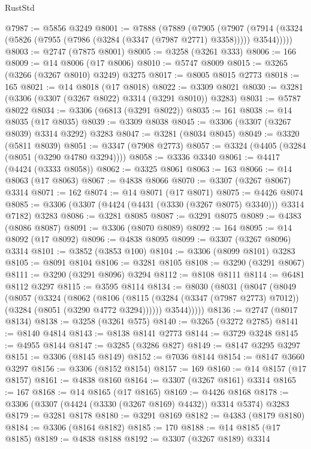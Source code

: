 \begin{lexlean}{RustStd}
\begin{coremodule}
@7987 := @5856 @3249
@8001 := @7888
    (@7889
      (@7905
        (@7907 (@7914 (@3324 (@5826 (@7955 (@7986 (@3284 (@3347 (@7987 @2771) @3358))))) @3544)))))
@8003 := @2747 (@7875 @8001)
@8005 := @3258 (@3261 @333)
@8006 := 166
@8009 := @14 @8006 (@17 @8006)
@8010 := @5747 @8009
@8015 := @3265 (@3266 (@3267 @8010) @3249) @3275
@8017 := @8005 @8015 @2773
@8018 := 165
@8021 := @14 @8018 (@17 @8018)
@8022 := @3309 @8021
@8030 := @3281 (@3306 (@3307 (@3267 @8022) @3314 (@3291 @8010)) @3283)
@8031 := @5787 @8022
@8034 := @3306 (@6813 (@3291 @8022))
@8035 := 161
@8038 := @14 @8035 (@17 @8035)
@8039 := @3309 @8038
@8045 := @3306 (@3307 (@3267 @8039) @3314 @3292) @3283
@8047 := @3281 (@8034 @8045)
@8049 := @3320 (@5811 @8039)
@8051 := @3347 (@7908 @2773)
@8057 := @3324 (@4405 (@3284 (@8051 (@3290 @4780 @3294))))
@8058 := @3336 @3340
@8061 := @4417 (@4424 (@3333 @8058))
@8062 := @3325 @8061
@8063 := 163
@8066 := @14 @8063 (@17 @8063)
@8067 := @4838 @8066
@8070 := @3307 (@3267 @8067) @3314
@8071 := 162
@8074 := @14 @8071 (@17 @8071)
@8075 := @4426 @8074
@8085 := @3306 (@3307 (@4424 (@4431 (@3330 (@3267 @8075) @3340))) @3314 @7182) @3283
@8086 := @3281 @8085
@8087 := @3291 @8075
@8089 := @4383 (@8086 @8087)
@8091 := @3306 (@8070 @8089)
@8092 := 164
@8095 := @14 @8092 (@17 @8092)
@8096 := @4838 @8095
@8099 := @3307 (@3267 @8096) @3314
@8101 := @3852 (@3853 @100)
@8104 := @3306 (@8099 @8101) @3283
@8105 := @8091 @8104
@8106 := @3281 @8105
@8108 := @3290 (@3291 @8067)
@8111 := @3290 (@3291 @8096) @3294
@8112 := @8108 @8111
@8114 := @6481 @8112 @3297
@8115 := @3595 @8114
@8134 := @8030
    (@8031
      (@8047
        (@8049
          (@8057
            (@3324
              (@8062
                (@8106
                  (@8115 (@3284 (@3347 (@7987 @2773) @7012)) (@3284 (@8051 (@3290 @4772 @3294))))))
              @3544)))))
@8136 := @2747 (@8017 @8134)
@8138 := @3258 (@3261 @575)
@8140 := @3265 (@3272 @2785)
@8141 := @8140 @4814
@8143 := @8138 @8141 @2773
@8144 := @3729 @3248
@8145 := @4955 @8144
@8147 := @3285 (@3286 @827)
@8149 := @8147 @3295 @3297
@8151 := @3306 (@8145 @8149)
@8152 := @7036 @8144
@8154 := @8147 @3660 @3297
@8156 := @3306 (@8152 @8154)
@8157 := 169
@8160 := @14 @8157 (@17 @8157)
@8161 := @4838 @8160
@8164 := @3307 (@3267 @8161) @3314
@8165 := 167
@8168 := @14 @8165 (@17 @8165)
@8169 := @4426 @8168
@8178 := @3306 (@3307 (@4424 (@3330 (@3267 @8169) @4432)) @3314 @5374) @3283
@8179 := @3281 @8178
@8180 := @3291 @8169
@8182 := @4383 (@8179 @8180)
@8184 := @3306 (@8164 @8182)
@8185 := 170
@8188 := @14 @8185 (@17 @8185)
@8189 := @4838 @8188
@8192 := @3307 (@3267 @8189) @3314

\end{coremodule}
\end{lexlean}
